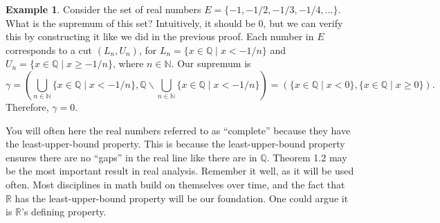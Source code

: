 \documentclass{article}
\newcommand{\N}{\mathbb{N}}
\newcommand{\R}{\mathbb{R}}
\newcommand{\Q}{\mathbb{Q}}
\theoremstyle{definition}
\newtheorem{example}{Example}[section]
\begin{document}
	\begin{example}
		Consider the set of real numbers $ E=\{-1,-1/2,-1/3,-1/4,\ldots\} $. What is the supremum of this set? Intuitively, it should be $ 0 $, but we can verify this by constructing it like we did in the previous proof. Each number in $ E $ corresponds to a cut $ (L_n,U_n) $, for $ L_n=\{x\in\Q\mid x<-1/n\} $ and $ U_n=\{x\in\Q\mid x\ge -1/n\} $, where $ n\in\N $. Our supremum is $$\gamma=\left(\bigcup_{n\in \N}\{x\in\Q\mid x<-1/n\},\Q\backslash \bigcup_{n\in \N}\{x\in\Q\mid x<-1/n\}\right)=(\{x\in\Q\mid x<0\},\{x\in\Q\mid x\ge0\}). $$ Therefore, $ \gamma=0 $.  
	\end{example}
	You will often here the real numbers referred to as ``complete'' because they have the least-upper-bound property. This is because the least-upper-bound property ensures there are no ``gaps'' in the real line like there are in $ \Q $. Theorem 1.2 may be the most important result in real analysis. Remember it well, as it will be used often. Most disciplines in math build on themselves over time, and the fact that $ \R $ has the least-upper-bound property will be our foundation. One could argue it is $ \R $'s defining property.  
	
\end{document}
